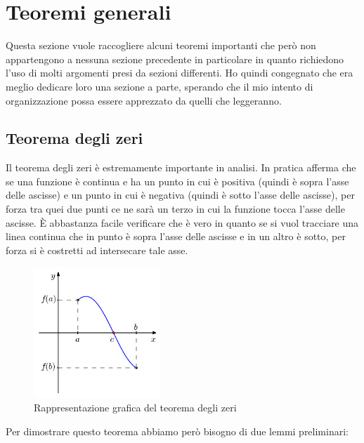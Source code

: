 \section{Teoremi generali}
Questa sezione vuole raccogliere alcuni teoremi importanti che però non appartengono a nessuna sezione precedente in particolare in quanto richiedono l'uso di molti argomenti presi da sezioni differenti. Ho quindi congegnato che era meglio dedicare loro una sezione a parte, sperando che il mio intento di organizzazione possa essere apprezzato da quelli che leggeranno.

\subsection{Teorema degli zeri}
Il teorema degli zeri è estremamente importante in analisi. In pratica afferma che se una funzione è continua e ha un punto in cui è positiva (quindi è sopra l'asse delle ascisse) e un punto in cui è negativa (quindi è sotto l'asse delle ascisse), per forza tra quei due punti ce ne sarà un terzo in cui la funzione tocca l'asse delle ascisse. È abbastanza facile verificare che è vero in quanto se si vuol tracciare una linea continua che in punto è sopra l'asse delle ascisse e in un altro è sotto, per forza si è costretti ad intersecare tale asse.
\begin{figure}[h]
    \centering
    \includegraphics[width=180px]{img/TeoremaZeri.jpg}
    \caption{Rappresentazione grafica del teorema degli zeri}
\end{figure}
Per dimostrare questo teorema abbiamo però bisogno di due lemmi preliminari:

